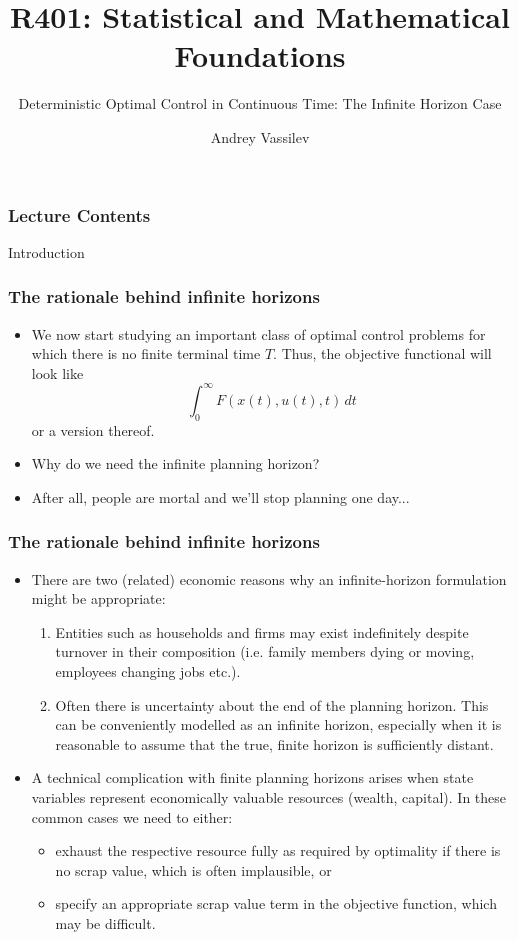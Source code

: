 \documentclass[10pt]{beamer}
\title{R401: Statistical and Mathematical Foundations \bigskip}
\subtitle{\textcolor{myred}{Deterministic Optimal Control in Continuous Time: The Infinite Horizon Case}}
\author{Andrey Vassilev}
\date{}
\theoremstyle{definition}
\begin{document}
\maketitle



\begin{frame}[fragile]
\frametitle{Lecture Contents}
\tableofcontents
\end{frame}

\begin{section}{Introduction}\label{sec:intro}

\begin{frame}[fragile]
\frametitle{The rationale behind infinite horizons}
\begin{itemize}\itemsep1em
\item We now start studying an important class of optimal control problems for which there is no finite terminal time $ T $. Thus, the objective functional will look like \[ \int_{0}^{\infty} F(x(t),u(t),t)\,dt \] or a version thereof.\pause
\item \alert{Why do we need the infinite planning horizon?}\pause
\item After all, people are mortal and we'll stop planning one day...
\end{itemize}
\end{frame}

\begin{frame}[fragile]
\frametitle{The rationale behind infinite horizons}
\begin{itemize}\itemsep1em
\item There are two (related) economic reasons why an infinite-horizon formulation might be appropriate:
\begin{enumerate}
\item Entities such as households and firms may exist indefinitely despite turnover in their composition (i.e. family members dying or moving, employees changing jobs etc.).
\item Often there is uncertainty about the end of the planning horizon. This can be conveniently modelled as an infinite horizon, especially when it is reasonable to assume that the true, finite horizon is sufficiently distant.
\end{enumerate}
\item A technical complication with finite planning horizons arises when state variables represent economically valuable resources (wealth, capital). In these common cases we need to either:
	\begin{itemize}
	\item exhaust the respective resource fully as required by optimality if there is no scrap value,  which is often implausible, or
	\item specify an appropriate scrap value term in the objective function, which may be difficult.
	\end{itemize}
\end{itemize}
\end{frame}


\end{section}
\end{document}
